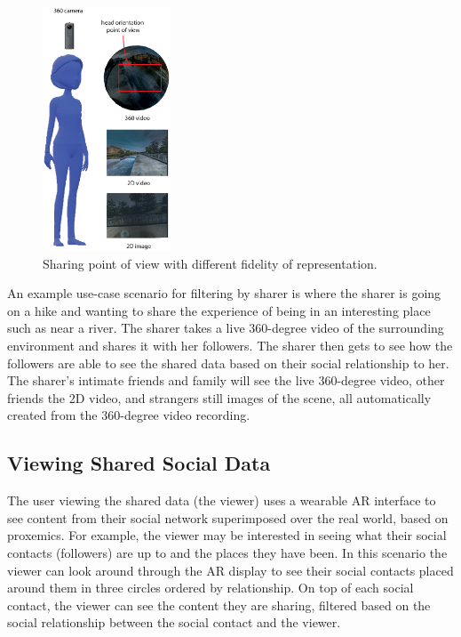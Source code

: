 \begin{figure}[ht]
    \centering
    \includegraphics[width=1.5in]{images/chi/images-04.eps}
    \caption{Sharing point of view with different fidelity of representation.}
    \label{fig:data:sharer}
\end{figure}

An example use-case scenario for filtering by sharer is where the sharer is going on a hike and wanting to share the experience of being in an interesting place such as near a river. The sharer takes a live 360-degree video of the surrounding environment and shares it with her followers. The sharer then gets to see how the followers are able to see the shared data based on their social relationship to her. The sharer's intimate friends and family will see the live 360-degree video, other friends the 2D video, and strangers still images of the scene, all automatically created from the 360-degree video recording.

\subsection{Viewing Shared Social Data}

The user viewing the shared data (the viewer) uses a wearable AR interface to see content from their social network superimposed over the real world, based on proxemics. For example, the viewer may be interested in seeing what their social contacts (followers) are up to and the places they have been. In this scenario the viewer can look around through the AR display to see their social contacts placed around them in three circles ordered by relationship. On top of each social contact, the viewer can see the content they are sharing, filtered based on the social relationship between the social contact and the viewer.

